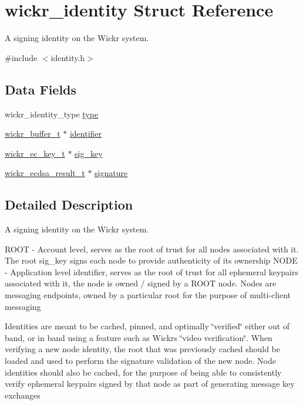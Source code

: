 \hypertarget{structwickr__identity}{}\section{wickr\+\_\+identity Struct Reference}
\label{structwickr__identity}


A signing identity on the Wickr system.  




{\ttfamily \#include $<$identity.\+h$>$}

\subsection*{Data Fields}
\begin{DoxyCompactItemize}
\item 
wickr\+\_\+identity\+\_\+type \mbox{\hyperlink{structwickr__identity_a685dae977849c05c84ee4a0b10c9396d}{type}}
\item 
\mbox{\hyperlink{structwickr__buffer}{wickr\+\_\+buffer\+\_\+t}} $\ast$ \mbox{\hyperlink{structwickr__identity_aed3657b22d83bb810b51ea1d1520b23e}{identifier}}
\item 
\mbox{\hyperlink{structwickr__ec__key}{wickr\+\_\+ec\+\_\+key\+\_\+t}} $\ast$ \mbox{\hyperlink{structwickr__identity_a788a08ac03576cb76d9b2eaf81a7af3e}{sig\+\_\+key}}
\item 
\mbox{\hyperlink{structwickr__ecdsa__result}{wickr\+\_\+ecdsa\+\_\+result\+\_\+t}} $\ast$ \mbox{\hyperlink{structwickr__identity_afb6bd9f5f9707be10fb273ce8d0b5928}{signature}}
\end{DoxyCompactItemize}


\subsection{Detailed Description}
A signing identity on the Wickr system. 

R\+O\+OT -\/ Account level, serves as the root of trust for all nodes associated with it. The root sig\+\_\+key signs each node to provide authenticity of its ownership N\+O\+DE -\/ Application level identifier, serves as the root of trust for all ephemeral keypairs associated with it, the node is owned / signed by a R\+O\+OT node. Nodes are messaging endpoints, owned by a particular root for the purpose of multi-\/client messaging

Identities are meant to be cached, pinned, and optimally \char`\"{}verified\char`\"{} either out of band, or in band using a feature such as Wickr\textquotesingle{}s \char`\"{}video verification\char`\"{}. When verifying a new node identity, the root that was previously cached should be loaded and used to perform the signature validation of the new node. Node identities should also be cached, for the purpose of being able to consistently verify ephemeral keypairs signed by that node as part of generating message key exchanges 

